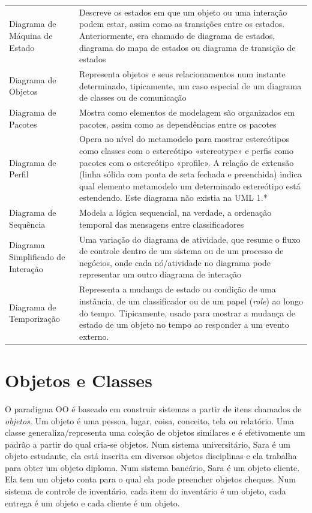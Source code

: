 \documentclass[
	article,			%
	12pt,				%
	openright,
	twoside,			%
	a4paper,			%
	english,			%
	french,
	brazil,				%
	sumario=tradicional
	]{abntex2}
\begin{document}
\begin{longtable}[l]{p{4.7cm}p{11cm}}
Diagrama de Máquina de Estado & Descreve os estados em que um objeto ou uma interação podem estar, assim como as transições entre os estados. Anteriormente, era chamado de diagrama de estados, diagrama do mapa de estados ou diagrama de transição de estados  \\

Diagrama de Objetos & Representa objetos e seus relacionamentos num instante determinado, tipicamente, um caso especial de um diagrama de classes ou de comunicação \\

Diagrama de Pacotes & Mostra como elementos de modelagem são organizados em pacotes, assim como as dependências entre os pacotes \\

Diagrama de Perfil & Opera no nível do metamodelo para mostrar estereótipos como classes com o estereótipo «stereotype» e perfis como pacotes com o estereótipo «profile». A relação de extensão (linha sólida com ponta de seta fechada e preenchida) indica qual elemento metamodelo um determinado estereótipo está estendendo. Este diagrama não existia na UML 1.* \\

Diagrama de Sequência & Modela a lógica sequencial, na verdade, a ordenação temporal das mensagens entre classificadores \\

Diagrama Simplificado de Interação & Uma variação do diagrama de atividade, que resume o fluxo de controle dentro de um sistema ou de um processo de negócios, onde cada nó/atividade no diagrama pode representar um outro diagrama de interação \\

Diagrama de Temporização & Representa a mudança de estado ou condição de uma instância, de um classificador ou de um papel (\textit{role}) ao longo do tempo. Tipicamente, usado para mostrar a mudança de estado de um objeto no tempo ao responder a um evento externo. \\

\end{longtable}

\section{Objetos e Classes}

O paradigma OO é baseado em construir sistemas a partir de itens chamados de \emph{objetos}. Um objeto é uma pessoa, lugar, coisa, conceito, tela ou relatório. Uma classe generaliza/representa uma coleção de objetos similares e é efetivamente um padrão a partir do qual cria-se objetos. Num sistema universitário, Sara é um objeto estudante, ela está inscrita em diversos objetos disciplinas e ela trabalha para obter um objeto diploma. Num sistema bancário, Sara é um objeto cliente. Ela tem um objeto conta para o qual ela pode preencher objetos cheques. Num sistema de controle de inventário, cada item do inventário é um objeto, cada entrega é um objeto e cada cliente é um objeto.
\end{document}
